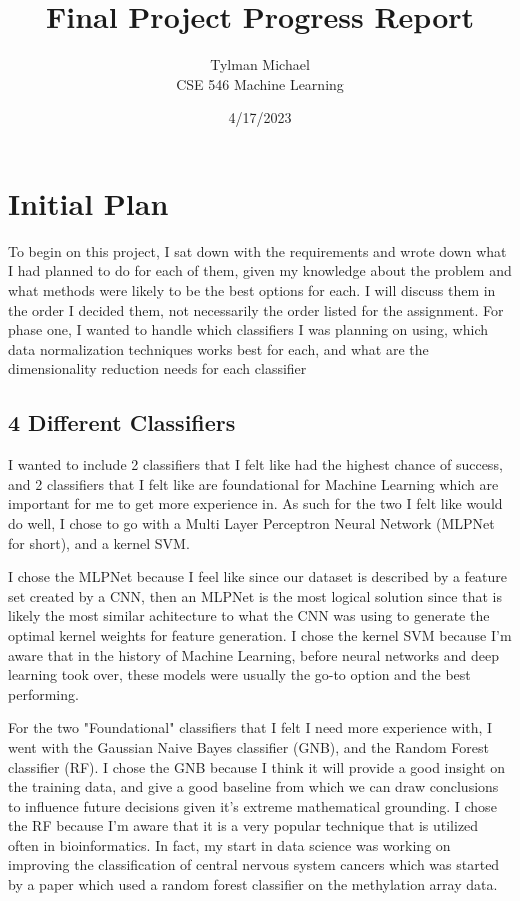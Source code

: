 \documentclass[12pt]{article}
\title{Final Project Progress Report}
\author{Tylman Michael\\CSE 546 Machine Learning}
\date{4/17/2023}
\begin{document}
\maketitle{}
\section{Initial Plan}
To begin on this project, I sat down with the requirements and wrote down what I had planned to do for each of them, 
given my knowledge about the problem and what methods were likely to be the best options for each. I will discuss them 
in the order I decided them, not necessarily the order listed for the assignment. For phase one, I wanted to handle 
which classifiers I was planning on using, which data normalization techniques works best for each, and what are the 
dimensionality reduction needs for each classifier

\subsection{4 Different Classifiers}
I wanted to include 2 classifiers that I felt like had the highest chance of success, and 2 classifiers that I felt like 
are foundational for Machine Learning which are important for me to get more experience in. As such for the two I felt like would do well, 
I chose to go with a Multi Layer Perceptron Neural Network (MLPNet for short), and a kernel SVM. 

I chose the MLPNet because I feel like since our 
dataset is described by a feature set created by a CNN, then an MLPNet is the most logical solution since that is likely 
the most similar achitecture to what the CNN was using to generate the optimal kernel weights for feature generation. I chose the kernel SVM because I'm aware that in the history of Machine Learning, before neural networks and deep learning 
took over, these models were usually the go-to option and the best performing.

For the two "Foundational" classifiers that I felt I need more experience with, I went with the Gaussian Naive Bayes 
classifier (GNB), and the Random Forest classifier (RF). I chose the GNB because I think it will provide a good insight 
on the training data, and give a good baseline from which we can draw conclusions to influence future decisions given it's 
extreme mathematical grounding. I chose the RF because I'm aware that it is a very popular technique that is utilized 
often in bioinformatics. In fact, my start in data science was working on improving the classification of central 
nervous system cancers which was started by a paper which used a random forest classifier on the methylation array data.
\end{document}
